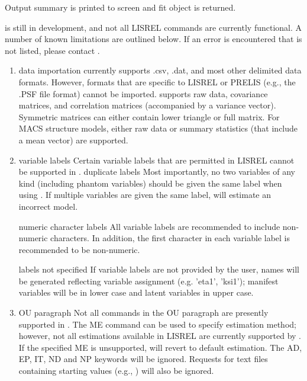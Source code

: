\documentclass[a4paper]{book}
\begin{document}
%
\begin{Value}
Output summary is printed to screen and  fit object is returned.
\end{Value}
%
\begin{Note}\relax
{} is still in development, and not all LISREL commands are currently functional. A number of known limitations are outlined below. If an error is encountered that is not listed, please contact .
\begin{enumerate}

\item data importation
 currently supports .csv, .dat, and most other delimited data formats. However, formats that are specific to LISREL or PRELIS (e.g., the .PSF file format) cannot be imported.  supports raw data, covariance matrices, and correlation matrices (accompanied by a variance vector). Symmetric matrices can either contain lower triangle or full matrix. For MACS structure models, either raw data or summary statistics (that include a mean vector) are supported.

\item variable labels
Certain variable labels that are permitted in LISREL cannot be supported in . 
duplicate labels
Most importantly, no two variables of any kind (including phantom variables) should be given the same label when using . If multiple variables are given the same label,  will estimate an incorrect model. 

numeric character labels
All variable labels are recommended to include non-numeric characters. In addition, the first character in each variable label is recommended to be non-numeric. 

labels not specified
If variable labels are not provided by the user, names will be generated reflecting variable assignment (e.g. 'eta1', 'ksi1'); manifest variables will be in lower case and latent variables in upper case. 


\item OU paragraph
Not all commands in the OU paragraph are presently supported in . The ME command can be used to specify estimation method; however, not all estimations available in LISREL are currently supported by . If the specified ME is unsupported,  will revert to default estimation. The AD, EP, IT, ND and NP keywords will be ignored. Requests for text files containing starting values (e.g., ) will also be ignored. 


\end{enumerate}
\end{Note}
\end{document}
